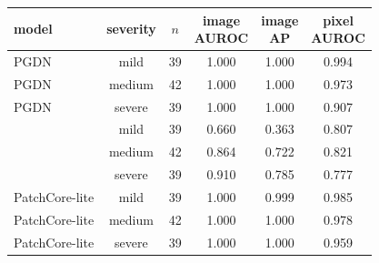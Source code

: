 \setlength{\tabcolsep}{3pt}
\begin{tabular}{@{}lccccc@{}}
\toprule
model & severity & $n$ & \shortstack{image\\AUROC} & \shortstack{image\\AP} & \shortstack{pixel\\AUROC} \\
\midrule
PGDN & mild & 39 & 1.000 & 1.000 & 0.994 \\
PGDN & medium & 42 & 1.000 & 1.000 & 0.973 \\
PGDN & severe & 39 & 1.000 & 1.000 & 0.907 \\
\draem{} & mild & 39 & 0.660 & 0.363 & 0.807 \\
\draem{} & medium & 42 & 0.864 & 0.722 & 0.821 \\
\draem{} & severe & 39 & 0.910 & 0.785 & 0.777 \\
PatchCore-lite & mild & 39 & 1.000 & 0.999 & 0.985 \\
PatchCore-lite & medium & 42 & 1.000 & 1.000 & 0.978 \\
PatchCore-lite & severe & 39 & 1.000 & 1.000 & 0.959 \\
\bottomrule
\end{tabular}
